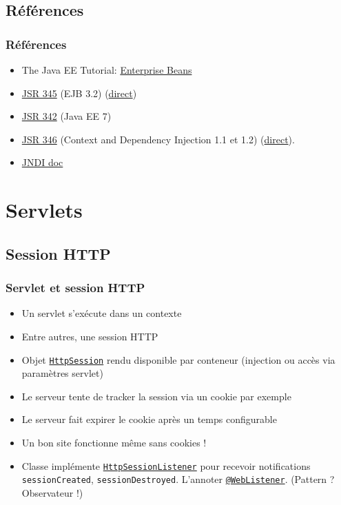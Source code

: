 \documentclass[english, french]{beamer}
\begin{document}
\subsection{Références}
\begin{frame}
	\frametitle{Références}
	\begin{itemize}
		\item The Java EE Tutorial: \href{http://docs.oracle.com/javaee/7/tutorial/partentbeans.htm}{Enterprise Beans}
		\item \href{https://www.jcp.org/en/jsr/detail?id=345}{JSR 345} (EJB 3.2) (\href{http://download.oracle.com/otn-pub/jcp/ejb-3_2-fr-eval-spec/ejb-3_2-core-fr-spec.pdf}{direct})
		\item \href{https://www.jcp.org/en/jsr/detail?id=342}{JSR 342} (Java EE 7)
		\item \href{http://jcp.org/en/jsr/detail?id=346}{JSR 346} (Context and Dependency Injection 1.1 et 1.2) (\href{http://download.oracle.com/otn-pub/jcp/cdi-1_2-mrel-eval-spec/cdi-1.2.pdf}{direct}).
		\item \href{http://docs.oracle.com/javase/8/docs/technotes/guides/jndi/}{JNDI doc}
	\end{itemize}
\end{frame}

\section{Servlets}
\subsection{Session HTTP}
\begin{frame}
	\frametitle{Servlet et session HTTP}
	\begin{itemize}
		\item Un servlet s’exécute dans un contexte
		\item Entre autres, une session HTTP
		\item Objet \href{http://docs.oracle.com/javaee/7/api/javax/servlet/http/HttpSession.html}{\texttt{HttpSession}} rendu disponible par conteneur ({\tiny injection ou } accès via paramètres servlet)
		\item Le serveur tente de tracker la session via un cookie {\tiny par exemple}
		\item Le serveur fait expirer le cookie après un temps configurable
		\item Un bon site fonctionne même sans cookies !
		\item Classe implémente \href{http://docs.oracle.com/javaee/7/api/javax/servlet/http/HttpSessionListener.html}{\texttt{HttpSessionListener}} pour recevoir notifications \texttt{sessionCreated}, \texttt{sessionDestroyed}.  L’annoter \href{http://docs.oracle.com/javaee/7/api/javax/servlet/annotation/WebListener.html}{\texttt{@WebListener}}. (Pattern ? \pause Observateur !)
	\end{itemize}
\end{frame}
\end{document}
